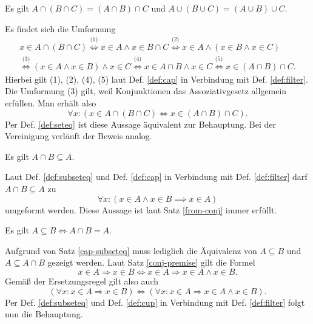 \begin{Satz}[Assoziativgesetze]%
\newlinefirst
Es gilt $A\cap (B\cap C) = (A\cap B)\cap C$
und $A\cup (B\cup C) = (A\cup B)\cup C$.
\end{Satz}

\begin{Beweis}
Es findet sich die Umformung
\begin{gather*}
x\in A\cap (B\cap C)
\stackrel{\text{(1)}}\iff x\in A\land x\in B\cap C
\stackrel{\text{(2)}}\iff x\in A\land (x\in B\land x\in C)\\
\stackrel{\text{(3)}}\iff (x\in A\land x\in B)\land x\in C
\stackrel{\text{(4)}}\iff x\in A\cap B\land x\in C
\stackrel{\text{(5)}}\iff x\in (A\cap B)\cap C.
\end{gather*}
Hierbei gilt (1), (2), (4), (5) laut Def. \ref{def:cap} in Verbindung
mit Def. \ref{def:filter}. Die Umformung (3) gilt, weil Konjunktionen
das Assoziativgesetz allgemein erfüllen. Man erhält also
\[\forall x\colon (x\in A\cap (B\cap C) \iff x\in (A\cap B)\cap C).\]
Per Def. \ref{def:seteq} ist diese Aussage äquivalent zur
Behauptung. Bei der Vereinigung verläuft der Beweis analog.\,\qedsymbol
\end{Beweis}

\begin{Satz}\label{cap-subseteq}
Es gilt $A\cap B\subseteq A$.
\end{Satz}
\begin{Beweis}
Laut Def. \ref{def:subseteq} und Def. \ref{def:cap} in Verbindung
mit Def. \ref{def:filter} darf $A\cap B\subseteq A$ zu
\[\forall x\colon (x\in A\land x\in B\implies x\in A)\]
umgeformt werden. Diese Aussage ist laut Satz \ref{from-conj}
immer erfüllt.
\end{Beweis}

\begin{Satz}\label{subseteq-char}
Es gilt $A\subseteq B\iff A\cap B=A$.
\end{Satz}
\begin{Beweis}
Aufgrund von Satz \ref{cap-subseteq} muss lediglich die Äquivalenz
von $A\subseteq B$ und $A\subseteq A\cap B$ gezeigt werden.
Laut Satz \ref{conj-premise} gilt die Formel
\[x\in A\Rightarrow x\in B\iff x\in A\Rightarrow x\in A\land x\in B.\]
Gemäß der Ersetzungsregel gilt also auch
\[(\forall x\colon x\in A\Rightarrow x\in B)
\iff (\forall x\colon x\in A\Rightarrow x\in A\land x\in B).\]
Per Def. \ref{def:subseteq} und Def. \ref{def:cup} in Verbindung
mit Def. \ref{def:filter} folgt nun die Behauptung.\,\qedsymbol
\end{Beweis}

